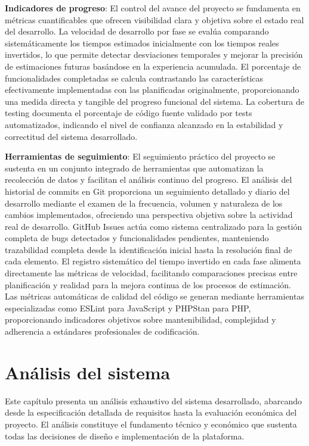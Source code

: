 \documentclass[12pt,a4paper,oneside]{report}
\begin{document}
\textbf{Indicadores de progreso}: El control del avance del proyecto se fundamenta en métricas cuantificables que ofrecen visibilidad clara y objetiva sobre el estado real del desarrollo. La velocidad de desarrollo por fase se evalúa comparando sistemáticamente los tiempos estimados inicialmente con los tiempos reales invertidos, lo que permite detectar desviaciones temporales y mejorar la precisión de estimaciones futuras basándose en la experiencia acumulada. El porcentaje de funcionalidades completadas se calcula contrastando las características efectivamente implementadas con las planificadas originalmente, proporcionando una medida directa y tangible del progreso funcional del sistema. La cobertura de testing documenta el porcentaje de código fuente validado por tests automatizados, indicando el nivel de confianza alcanzado en la estabilidad y correctitud del sistema desarrollado.

\textbf{Herramientas de seguimiento}: El seguimiento práctico del proyecto se sustenta en un conjunto integrado de herramientas que automatizan la recolección de datos y facilitan el análisis continuo del progreso. El análisis del historial de commits en Git proporciona un seguimiento detallado y diario del desarrollo mediante el examen de la frecuencia, volumen y naturaleza de los cambios implementados, ofreciendo una perspectiva objetiva sobre la actividad real de desarrollo. GitHub Issues actúa como sistema centralizado para la gestión completa de bugs detectados y funcionalidades pendientes, manteniendo trazabilidad completa desde la identificación inicial hasta la resolución final de cada elemento. El registro sistemático del tiempo invertido en cada fase alimenta directamente las métricas de velocidad, facilitando comparaciones precisas entre planificación y realidad para la mejora continua de los procesos de estimación. Las métricas automáticas de calidad del código se generan mediante herramientas especializadas como ESLint para JavaScript y PHPStan para PHP, proporcionando indicadores objetivos sobre mantenibilidad, complejidad y adherencia a estándares profesionales de codificación.

\chapter{Análisis del sistema}\label{anuxe1lisis-del-sistema}
Este capítulo presenta un análisis exhaustivo del sistema desarrollado, abarcando desde la especificación detallada de requisitos hasta la evaluación económica del proyecto. El análisis constituye el fundamento técnico y económico que sustenta todas las decisiones de diseño e implementación de la plataforma.
\end{document}
